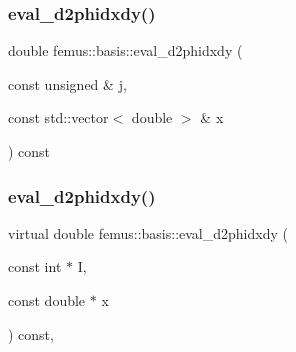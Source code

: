 \mbox{\label{classfemus_1_1basis_a9ebb6c277754a3f21be2f9b0f56428ff}} 
\subsubsection{\texorpdfstring{eval\+\_\+d2phidxdy()}{eval\_d2phidxdy()}\hspace{0.1cm}{\footnotesize\ttfamily [1/2]}}
{\footnotesize\ttfamily double femus\+::basis\+::eval\+\_\+d2phidxdy (\begin{DoxyParamCaption}\item[{const unsigned \&}]{j,  }\item[{const std\+::vector$<$ double $>$ \&}]{x }\end{DoxyParamCaption}) const\hspace{0.3cm}{\ttfamily [inline]}}

\mbox{\label{classfemus_1_1basis_ac9feaf9e60421143db2a3708f3c7fa48}} 
\subsubsection{\texorpdfstring{eval\+\_\+d2phidxdy()}{eval\_d2phidxdy()}\hspace{0.1cm}{\footnotesize\ttfamily [2/2]}}
{\footnotesize\ttfamily virtual double femus\+::basis\+::eval\+\_\+d2phidxdy (\begin{DoxyParamCaption}\item[{const int $\ast$}]{I,  }\item[{const double $\ast$}]{x }\end{DoxyParamCaption}) const\hspace{0.3cm}{\ttfamily [inline]}, {\ttfamily [virtual]}}



